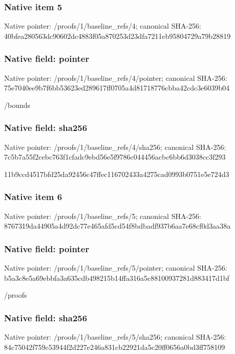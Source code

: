 \documentclass[10pt,a4paper]{article}
\begin{document}
\subsubsection{Native item 5}
Native pointer: /proofs/1/baseline\_\allowbreak{}refs/4; canonical SHA-256: 40bfea280563dc90602dc4883f05a870253d23dfa7211eb95804729a79b28819

\subsubsection{Native field: pointer}
Native pointer: /proofs/1/baseline\_\allowbreak{}refs/4/pointer; canonical SHA-256: 75e7040ee9b7f6bb53623ed289617ff0705a4d81718776cbba42cdc3e6039b04

\begingroup\raggedright\sloppy /\allowbreak{}bounds\par\endgroup

\subsubsection{Native field: sha256}
Native pointer: /proofs/1/baseline\_\allowbreak{}refs/4/sha256; canonical SHA-256: 7c5b7a55f2cebc763f1cfadc9ebd56e5f9786c044456acbc6bb6d3038cc3f293

\begingroup\raggedright\sloppy 11b9ccd4517bfd25da92456c47ffec116702433a4275cad0993b0751e5e724d3\par\endgroup

\subsubsection{Native item 6}
Native pointer: /proofs/1/baseline\_\allowbreak{}refs/5; canonical SHA-256: 8767319da44905a4d92dc77e465afd5cd54f8bdbadf937b6aa7e68cf0d3aa38a

\subsubsection{Native field: pointer}
Native pointer: /proofs/1/baseline\_\allowbreak{}refs/5/pointer; canonical SHA-256: b5a3c8e5a69ebbfa3a635cdb498215b14ffa316a5c88100937281d883417d1bf

\begingroup\raggedright\sloppy /\allowbreak{}proofs\par\endgroup

\subsubsection{Native field: sha256}
Native pointer: /proofs/1/baseline\_\allowbreak{}refs/5/sha256; canonical SHA-256: 84c75042f759c53944f2d227e246a831cb22921da5c20ff0656a0bd3ff758109
\end{document}

